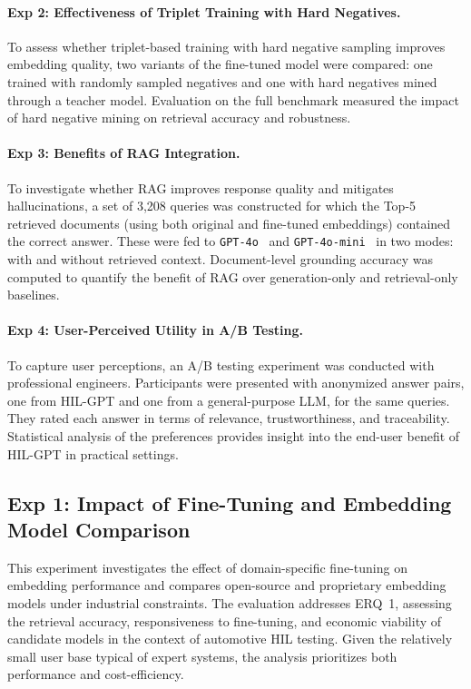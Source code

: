 \documentclass[a4paper,fleqn]{cas-dc}
\renewcommand{\textit}[1]{#1}
\begin{document}
\paragraph{Exp 2: Effectiveness of Triplet Training with Hard Negatives.}  
To assess whether triplet-based training with hard negative sampling improves embedding quality, two variants of the fine-tuned model were compared: one trained with randomly sampled negatives and one with hard negatives mined through a teacher model. Evaluation on the full benchmark measured the impact of hard negative mining on retrieval accuracy and robustness.

\paragraph{Exp 3: Benefits of RAG Integration.}  
To investigate whether RAG improves response quality and mitigates hallucinations, a set of 3,208 queries was constructed for which the Top-5 retrieved documents (using both original and fine-tuned embeddings) contained the correct answer. These were fed to \texttt{GPT-4o}~\cite{openai-gpt4o} and \texttt{GPT-4o-mini}~\cite{openai-gpt4o-mini} in two modes: with and without retrieved context. Document-level grounding accuracy was computed to quantify the benefit of RAG over generation-only and retrieval-only baselines.

\paragraph{Exp 4: User-Perceived Utility in A/B Testing.}  
To capture user perceptions, an A/B testing experiment was conducted with professional engineers. Participants were presented with anonymized answer pairs, one from HIL-GPT and one from a general-purpose LLM, for the same queries. They rated each answer in terms of relevance, trustworthiness, and traceability. Statistical analysis of the preferences provides insight into the end-user benefit of HIL-GPT in practical settings.

\subsection{Exp 1: Impact of Fine-Tuning and Embedding Model Comparison}
\label{sec:exp-embedding}

This experiment investigates the effect of domain-specific fine-tuning on embedding performance and compares open-source and proprietary embedding models under industrial constraints. The evaluation addresses \textit{ERQ~1}, assessing the retrieval accuracy, responsiveness to fine-tuning, and economic viability of candidate models in the context of automotive HIL testing. Given the relatively small user base typical of expert systems, the analysis prioritizes both performance and cost-efficiency.
\end{document}
